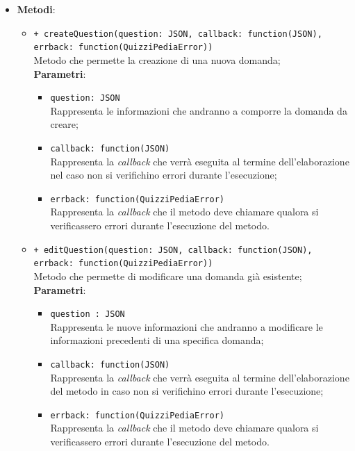 \begin{itemize}
\begin{itemize}
\begin{itemize}
		\end{itemize}
	\end{itemize}
\item \textbf{Metodi}:
	\begin{itemize}
	\item \texttt{+ createQuestion(question: JSON, callback: function(JSON),\\ errback: function(QuizziPediaError))} \\
	Metodo che permette la creazione di una nuova domanda; \\
		\textbf{Parametri}:
		\begin{itemize}
			\item \texttt{question: JSON} \\
			Rappresenta le informazioni che andranno a comporre la domanda da creare;
			\item \texttt{callback: function(JSON)} \\
			Rappresenta la \textit{callback} che verrà eseguita al termine dell'elaborazione nel caso non si verifichino errori durante l'esecuzione;
			\item \texttt{errback: function(QuizziPediaError)} \\
			Rappresenta la \textit{callback} che il metodo deve chiamare qualora si verificassero errori durante l'esecuzione del metodo.
		\end{itemize}   
	\item \texttt{+ editQuestion(question: JSON, callback: function(JSON),\\ errback: function(QuizziPediaError))} \\
	Metodo che permette di modificare una domanda già esistente; \\
		\textbf{Parametri}:
		\begin{itemize}
			\item \texttt{question : JSON} \\
			Rappresenta le nuove informazioni che andranno a modificare le informazioni precedenti di una specifica domanda;
			\item \texttt{callback: function(JSON)} \\
			Rappresenta la \textit{callback} che verrà eseguita al termine dell'elaborazione del metodo in caso non si verifichino errori durante l'esecuzione;
			\item \texttt{errback: function(QuizziPediaError)} \\
			Rappresenta la \textit{callback} che il metodo deve chiamare qualora si verificassero errori durante l'esecuzione del metodo.

\end{itemize}
\end{itemize}
\end{itemize}

